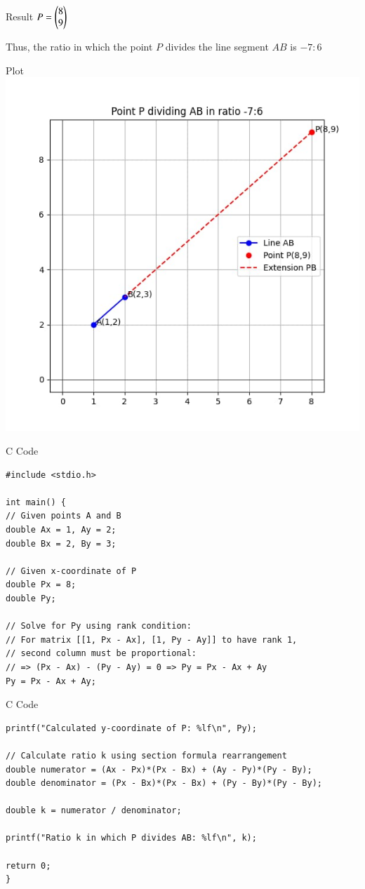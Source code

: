 \documentclass{beamer}
\begin{document}
\begin{frame}{Result}
$
P = \begin{pmatrix}8 \\ 9\end{pmatrix}
$

Thus, the ratio in which the point $P$ divides the line segment $AB$ is
$
\boxed{-7 : 6}
$

\end{frame}

\begin{frame}{Plot}
\centering
\includegraphics[width=0.7\linewidth]{figs/fig1.jpg}
\end{frame}

\begin{frame}[fragile]{C Code}
\begin{verbatim}
#include <stdio.h>

int main() {
// Given points A and B
double Ax = 1, Ay = 2;
double Bx = 2, By = 3;

// Given x-coordinate of P
double Px = 8;
double Py;

// Solve for Py using rank condition:
// For matrix [[1, Px - Ax], [1, Py - Ay]] to have rank 1,
// second column must be proportional:
// => (Px - Ax) - (Py - Ay) = 0 => Py = Px - Ax + Ay
Py = Px - Ax + Ay;
\end{verbatim}
\end{frame}
\begin{frame}[fragile]{C Code}
\begin{verbatim}
printf("Calculated y-coordinate of P: %lf\n", Py);

// Calculate ratio k using section formula rearrangement
double numerator = (Ax - Px)*(Px - Bx) + (Ay - Py)*(Py - By);
double denominator = (Px - Bx)*(Px - Bx) + (Py - By)*(Py - By);

double k = numerator / denominator;

printf("Ratio k in which P divides AB: %lf\n", k);

return 0;
}
\end{verbatim}

\end{frame}
\end{document}
